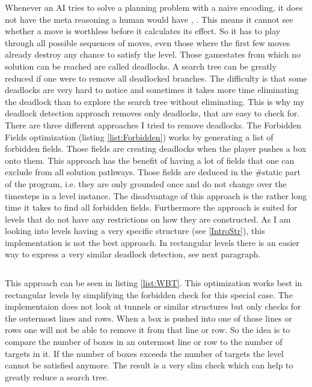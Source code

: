 \documentclass{report}
\begin{document}

\begin{lstlisting}[caption={Forbidden Fields},label=list:Forbidden]
\end{lstlisting}

Whenever an AI tries to solve a planning problem with a naive encoding, it does not have the meta reasoning a human would have \cite{BoteaHeuristicsVsPlanning}, \cite{SokoRelevanceCuts}. This means it cannot see whether a move is worthless before it calculates its effect. So it has to play through all possible sequences of moves, even those where the first few moves already destroy any chance to satisfy the level. Those gamestates from which no solution can be reached are called deadlocks. A search tree can be greatly reduced if one were to remove all deadlocked branches. The difficulty is that some deadlocks are very hard to notice and sometimes it takes more time eliminating the deadlock than to explore the search tree without eliminating. This is why my deadlock detection approach removes only deadlocks, that are easy to check for. There are three different approaches I tried to remove deadlocks. The Forbidden Fields optimization (listing \ref{list:Forbidden}) works by generating a list of forbidden fields. Those fields are creating deadlocks when the player pushes a box onto them. This approach has the benefit of having a lot of fields that one can exclude from all solution pathways. Those fields are deduced in the \#static part of the program, i.e. they are only grounded once and do not change over the timesteps in a level instance.
The disadvantage of this approach is the rather long time it takes to find all forbidden fields. Furthermore the approach is suited for levels that do not have any restrictions on how they are constructed. As I am looking into levels having a very specific structure (see \ref{IntroStr}), this implementation is not the best approach. In rectangular levels there is an easier way to express a very similar deadlock detection, see next paragraph.


\begin{lstlisting}[caption={Deadlock check},label=list:WBT]
\end{lstlisting}

This approach can be seen in listing \ref{list:WBT}. This optimization works best in rectangular levels by simplifying the forbidden check for this special case. The implementaion does not look at tunnels or similar structures but only checks for the outermost lines and rows. When a box is pushed into one of those lines or rows one will not be able to remove it from that line or row. So the idea is to compare the number of boxes in an outermost line or row to the number of targets in it. If the number of boxes exceeds the number of targets the level cannot be satisfied anymore. The result is a very slim check which can help to greatly reduce a search tree.
\end{document}
